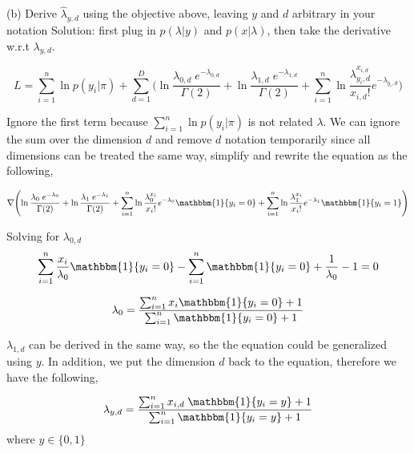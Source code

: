 \documentclass[11pt]{report}
\begin{document}
\pagebreak

\justify (b) Derive $\hat{\lambda}_{y, d}$ using the objective above, leaving $y$ and $d$ arbitrary in your notation
\justify Solution: first plug in $p(\lambda | y)$ and $p(x | \lambda)$, then take the derivative w.r.t $\lambda_{y,d}$. 

\[
L= \sum_{i=1}^{n} \ln {p(y_{i}|\pi)} +  \sum_{d=1}^{D} \Biggl( \ln{ \frac{ \lambda_{0,d} \; e^{-\lambda_{0,d}} } {\Gamma(2)} } + \ln{ \frac{ \lambda_{1,d} \; e^{-\lambda_{1,d}} } {\Gamma(2)} }  + \sum_{i=1}^{n} \ln{\frac{ \lambda_{y_{i}, d}^{x_{i,d}}} {x_{i,d}!}e^ {-\lambda_{y_{i},d}} \Biggr)}
\]

\-
\justify Ignore the first term because $\sum_{i=1}^{n} \ln {p(y_{i}|\pi)}$ is not related $\lambda$. We can ignore the sum over the dimension $d$ and remove $d$ notation temporarily since all dimensions can be treated the same way, simplify and rewrite the equation as the following, 

\begin{small}
\[
\nabla{
\Biggl(
\ln{ \frac{ \lambda_{0} \; e^{-\lambda_{0}} } {\Gamma(2)} } + \ln{ \frac{ \lambda_{1} \; e^{-\lambda_{1}} } {\Gamma(2)} }  
+ \sum_{i=1}^{n} \ln{\frac{ \lambda_{0}^{x_{i}}} {x_{i}!}e^ {-\lambda_{0}}  \mathbbm{1}\{ y_{i} = 0 \} } 
+ \sum_{i=1}^{n} \ln{\frac{ \lambda_{1}^{x_{i}}} {x_{i}!}e^ {-\lambda_{1}}  \mathbbm{1}\{ y_{i} = 1} \}
\Biggr)
}
\]
\end{small}

\-
\justify Solving for $\lambda_{0, d}$
\[
\sum_{i=1}^{n} \frac{ x_{i} } {\lambda_{0}} \mathbbm{1}\{ y_{i} = 0 \}   -  \sum_{i=1}^{n} \mathbbm{1}\{ y_{i} = 0 \}  + \frac {1} {\lambda_{0}} - 1 = 0 
\]

\[
\lambda_{0} = \frac {\sum_{i=1}^{n} x_{i} \mathbbm{1}\{ y_{i} = 0 \} + 1} {\sum_{i=1}^{n} \mathbbm{1}\{ y_{i} = 0 \} + 1} 
\]

\- 
\justify $\lambda_{1,d}$ can be derived in the same way, so the the equation could be generalized using $y$. In addition, we put the dimension $d$ back to the equation, therefore we have the following,

\[
\lambda_{y, d} = \frac {\sum_{i=1}^{n} x_{i, d} \; \mathbbm{1}\{ y_{i} = y \} + 1} {\sum_{i=1}^{n} \mathbbm{1}\{ y_{i} = y \} + 1}  
\]
where $y \in \{0, 1\}$
\end{document}
